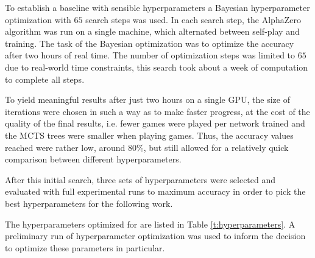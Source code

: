 \documentclass[12pt,onecolumn,oneside,titlepage]{article}
\begin{document}
To establish a baseline with sensible hyperparameters a Bayesian hyperparameter optimization with $65$ search steps was used.
In each search step, the AlphaZero algorithm was run on a single machine, which alternated between self-play and training. The task of the Bayesian optimization was to optimize the accuracy after two hours of real time. 
The number of optimization steps was limited to $65$ due to real-world time constraints, this search took about a week of computation to complete all steps.

To yield meaningful results after just two hours on a single GPU,
the size of iterations were chosen in such a way as to make faster progress, at the cost of the quality of the final results, i.e. fewer games were played per network trained and 
the MCTS trees were smaller when playing games. Thus, the accuracy values reached were rather low, around $80\%$,
but still allowed for a relatively quick comparison between different hyperparameters. 

After this initial search, three sets of hyperparameters were selected and evaluated with full experimental runs to maximum accuracy in order to pick the best hyperparameters for the following work.

The hyperparameters optimized for are listed in Table \ref{t:hyperparameters}. A preliminary run of hyperparameter optimization was used to inform the decision to optimize these parameters in particular.
\end{document}
